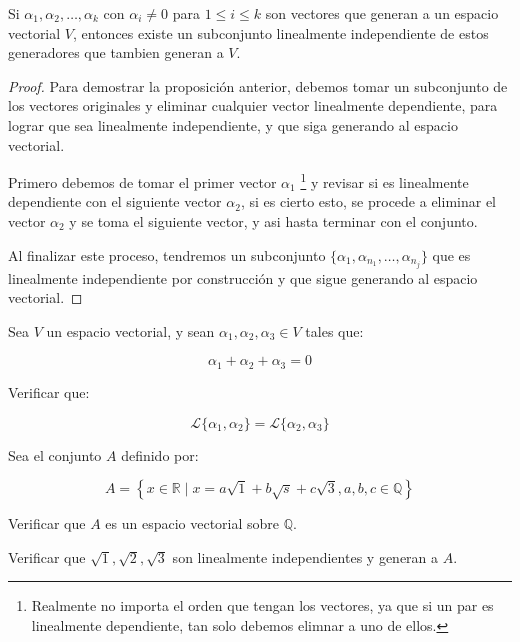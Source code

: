 		\begin{proposicion}
			Si $\alpha_1, \alpha_2, \dots, \alpha_k$ con $\alpha_i \ne 0$ para $1 \leq i \leq k$ son vectores que generan a un espacio vectorial $V$, entonces existe un subconjunto linealmente independiente de estos generadores que tambien generan a $V$.
		\end{proposicion}

		\begin{proof}
			Para demostrar la proposición anterior, debemos tomar un subconjunto de los vectores originales y eliminar cualquier vector linealmente dependiente, para lograr que sea linealmente independiente, y que siga generando al espacio vectorial.

			Primero debemos de tomar el primer vector $\alpha_1$ \footnote{Realmente no importa el orden que tengan los vectores, ya que si un par es linealmente dependiente, tan solo debemos elimnar a uno de ellos.} y revisar si es linealmente dependiente con el siguiente vector $\alpha_2$, si es cierto esto, se procede a eliminar el vector $\alpha_2$ y se toma el siguiente vector, y asi hasta terminar con el conjunto.

			Al finalizar este proceso, tendremos un subconjunto $\{ \alpha_1, \alpha_{n_1}, \dots, \alpha_{n_j}\}$ que es linealmente independiente por construcción y que sigue generando al espacio vectorial.
		\end{proof}

		\begin{ejercicio}
			Sea $V$ un espacio vectorial, y sean $\alpha_1, \alpha_2, \alpha_3 \in V$ tales que:

			\begin{equation*}
				\alpha_1 + \alpha_2 + \alpha_3 = 0
			\end{equation*}

			Verificar que:

			\begin{equation*}
				\mathcal{L}\{ \alpha_1, \alpha_2 \} = \mathcal{L}\{ \alpha_2, \alpha_3 \}
			\end{equation*}
		\end{ejercicio}

		\begin{ejercicio}
			Sea el conjunto $A$ definido por:

			\begin{equation*}
				A = \left\{ x \in \mathbb{R} \mid x = a \sqrt{1} + b \sqrt{s} + c \sqrt{3}, a, b, c \in \mathbb{Q} \right\}
			\end{equation*}

			Verificar que $A$ es un espacio vectorial sobre $\mathbb{Q}$.

			Verificar que $\sqrt{1}, \sqrt{2}, \sqrt{3}$ son linealmente independientes y generan a $A$.
		\end{ejercicio}


